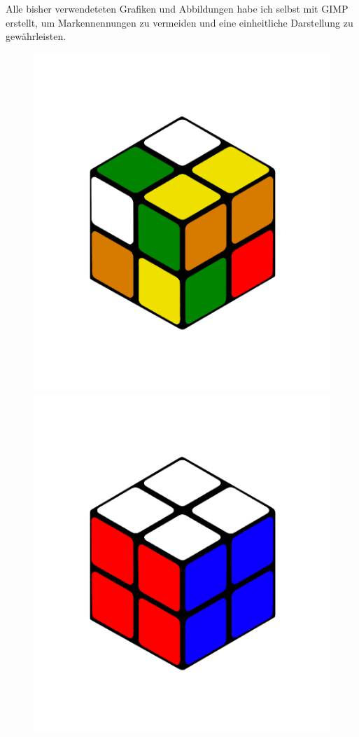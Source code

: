 \documentclass[12pt,a4paper, usenames, dvipsnames]{scrartcl}
\begin{document}
Alle bisher verwendeteten Grafiken und Abbildungen habe ich selbst mit GIMP erstellt, um Markennennungen zu vermeiden und eine einheitliche Darstellung zu gewährleisten.
\begin{figure}[h]
\includegraphics[scale=0.085]{2x2scrambled.png}
\includegraphics[scale=0.085]{2x2solved.png}

\end{figure}
\end{document}
